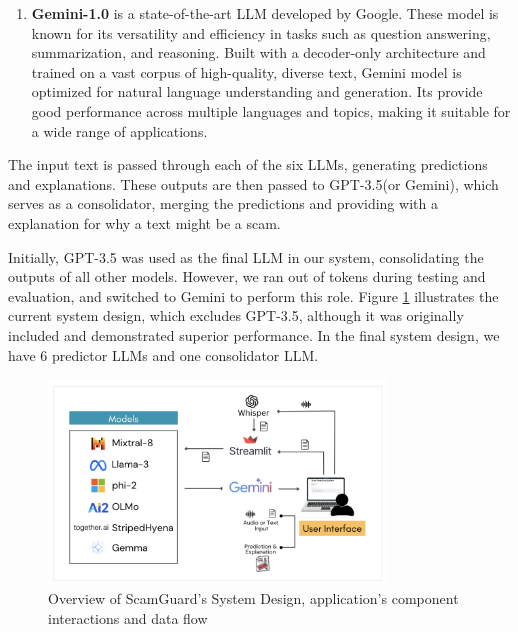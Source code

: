 \documentclass[11pt]{article}
\begin{document}
\begin{enumerate}
    \item \textbf{Gemini-1.0} is a state-of-the-art LLM developed by Google. These model is known for its versatility and efficiency in tasks such as question answering, summarization, and reasoning. Built with a decoder-only architecture and trained on a vast corpus of high-quality, diverse text, Gemini model is optimized for natural language understanding and generation. Its provide good performance across multiple languages and topics, making it suitable for a wide range of applications.
    
\end{enumerate}

The input text is passed through each of the six LLMs, generating predictions and explanations. These outputs are then passed to GPT-3.5(or Gemini), which serves as a consolidator, merging the predictions and providing with a explanation for why a text might be a scam.

Initially, GPT-3.5 was used as the final LLM in our system, consolidating the outputs of all other models. However, we ran out of tokens during testing and evaluation, and switched to Gemini to perform this role. Figure \ref{fig:flowchart} illustrates the current system design, which excludes GPT-3.5, although it was originally included and demonstrated superior performance. In the final system design, we have 6 predictor LLMs and one consolidator LLM.



\begin{figure}[ht]
    \centering
    \includegraphics[width=0.8\textwidth]{flowchart.png} %
    \caption{Overview of ScamGuard's System Design, application's component interactions and data flow}
    \label{fig:flowchart}
\end{figure}
\end{document}
